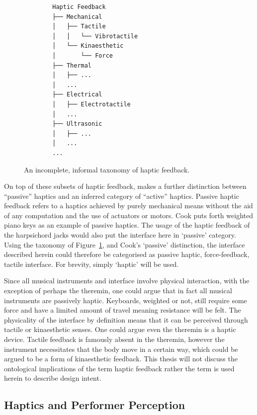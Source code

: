 \begin{figure}
    \centering
    \begin{verbatim}
        Haptic Feedback
        ├── Mechanical        
        │   ├── Tactile      
        │   │   └── Vibrotactile
        │   └── Kinaesthetic
        │       └── Force
        ├── Thermal
        │   ├── ...
        │   ...
        ├── Electrical
        │   ├── Electrotactile
        │   ...
        ├── Ultrasonic
        │   ├── ...
        │   ...
        ...
    \end{verbatim}
        
    \caption{An incomplete, informal taxonomy of haptic feedback.}
    \label{fig:taxonomy}
\end{figure}

On top of these subsets of haptic feedback, \textcite{cook_remutualizing_2004} makes a further distinction between
``passive'' haptics and an inferred category of ``active'' haptics.
Passive haptic feedback refers to a haptics achieved by purely mechanical
means without the aid of any computation and the use of actuators or motors.
Cook puts forth weighted piano keys as an example of passive haptics. The usage
of the haptic feedback of the harpsichord jacks would also put the interface
here in `passive' category. Using the taxonomy of Figure~\ref{fig:taxonomy}, and
Cook's `passive' distinction, the interface described herein could therefore be
categorised as passive haptic, force-feedback, tactile interface. For brevity,
simply `haptic' will be used.

Since all musical instruments and interface involve physical interaction, with
the exception of perhaps the theremin, one could argue that in fact all musical
instruments are passively haptic. Keyboards, weighted or not, still require some force and
have a limited amount of travel meaning resistance will be felt. The physicality of the interface by definition means that it can be perceived through tactile or kinaesthetic senses. One could argue even
the theremin is a haptic device. Tactile feedback is famously absent in the theremin, however the instrument necessitates that the body move in a certain way, which could be argued to be a form of kinaesthetic feedback. This thesis will not discuss the ontological implications of the term haptic feedback rather the term is used herein to describe design intent.


\subsection{Haptics and Performer Perception}\label{musical-haptics} 

